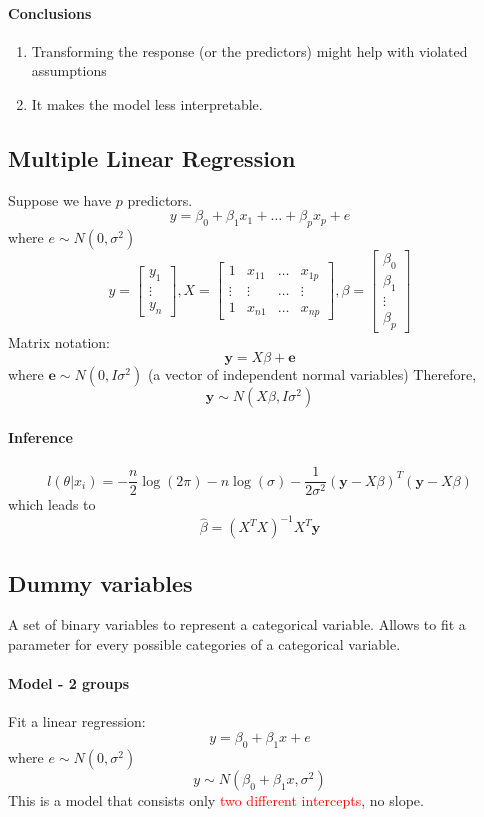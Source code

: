 \documentclass[11pt]{article}
\newcommand{\tb}[1]{\textbf{#1}}
\newcommand{\vy}[0]{\tb{y}}
\newcommand{\ve}[0]{\tb{e}}
\begin{document}
\paragraph{Conclusions}
\begin{enumerate}
	\item Transforming the response (or the predictors) might help with violated assumptions
	\item It makes the model less interpretable.
\end{enumerate}
\subsection{Multiple Linear Regression}
Suppose we have $p$ predictors.
$$y = \beta_0 + \beta_1x_1 + \hdots + \beta_p x_p + e$$ where $e \sim N(0, \sigma^2)$
$$y = \begin{bmatrix} y_1 \\ \vdots \\ y_n \end{bmatrix},
X = \begin{bmatrix}
	1 & x_{11} & \hdots & x_{1p} \\
	\vdots & \vdots & \hdots & \vdots \\
	1 & x_{n1} & \hdots & x_{np}
\end{bmatrix}, \beta = \begin{bmatrix}
	\beta_0 \\ \beta_1 \\ \vdots \\ \beta_p
\end{bmatrix}$$
Matrix notation:
$$\vy = X\beta + \ve$$ where $\ve \sim N(0, I\sigma^2)$ (a vector of independent normal variables)
Therefore,
$$ \vy \sim N(X\beta, I\sigma^2)$$
\paragraph{Inference}
$$l(\theta|x_i) = -\frac{n}{2} \log(2\pi) - n\log(\sigma) - \frac{1}{2\sigma^2}(\vy - X\beta)^T(\vy - X\beta)$$
which leads to $$\hat{\beta} = (X^TX)^{-1}X^T\vy$$
\subsection{Dummy variables}
A set of binary variables to represent a categorical variable.
Allows to fit a parameter for every possible categories of a categorical variable.
\paragraph{Model - 2 groups}
Fit a linear regression:
$$y = \beta_0 + \beta_1x + e$$ where $e \sim N(0, \sigma^2)$
$$y \sim N(\beta_0 + \beta_1 x, \sigma^2)$$
This is a model that consists only \textcolor{red}{two different intercepts}, no slope.
\end{document}
